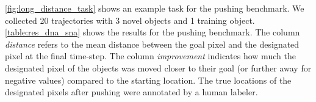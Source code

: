 \autoref{fig:long_distance_task} shows an example task for the pushing benchmark.
We collected 20 trajectories with 3 novel objects and 1 training object. \autoref{table:res_dna_sna} shows the results for the pushing benchmark. The column \textit{distance} refers to the mean distance between the goal pixel and the designated pixel at the final time-step. The column \textit{improvement} indicates how much the designated pixel of the objects was moved closer to their goal (or further away for negative values) compared to the starting location. The true locations of the designated pixels after pushing were annotated by a human labeler.

